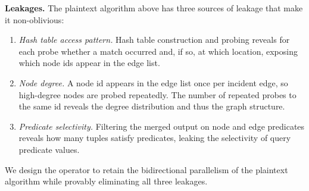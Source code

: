 \noindent\textbf{Leakages.}
The plaintext algorithm above has three sources of leakage that make it 
non-oblivious:
\begin{enumerate}[leftmargin=*]
    \item \textit{Hash table access pattern.} Hash table construction and probing
    reveals for each probe whether a match occurred and, if so, at which location,
    exposing which node ids appear in the edge list.

    \item \textit{Node degree.} A node id appears in the edge list once per 
    incident edge, so high-degree nodes are probed repeatedly. The number 
    of repeated probes to the same id reveals the degree distribution and 
    thus the graph structure.

    \item \textit{Predicate selectivity.} Filtering the merged output on 
    node and edge predicates reveals how many tuples satisfy predicates, 
    leaking the selectivity of query predicate values.
\end{enumerate}

We design the \onehop operator to retain the bidirectional parallelism of 
the plaintext algorithm while provably eliminating all three leakages.





